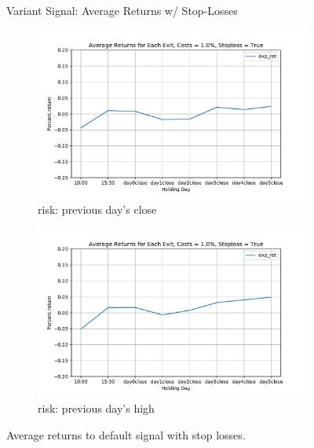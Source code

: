 \documentclass{article}
\begin{document}
\begin{figure}
\centering
Variant Signal: Average Returns w/ Stop-Losses
\begin{subfigure}{\linewidth}
  \centering
  \includegraphics[width=\linewidth]{avg_ret_risk_close_var_1.pdf}
  \caption{risk: previous day's close}
\end{subfigure}
\begin{subfigure}{\linewidth}
  \centering
  \includegraphics[width=\linewidth]{avg_ret_risk_high_var_1.pdf}
  \caption{risk: previous day's high}
\end{subfigure}
\caption{Average returns to default signal with stop losses.}
\end{figure}
\end{document}
